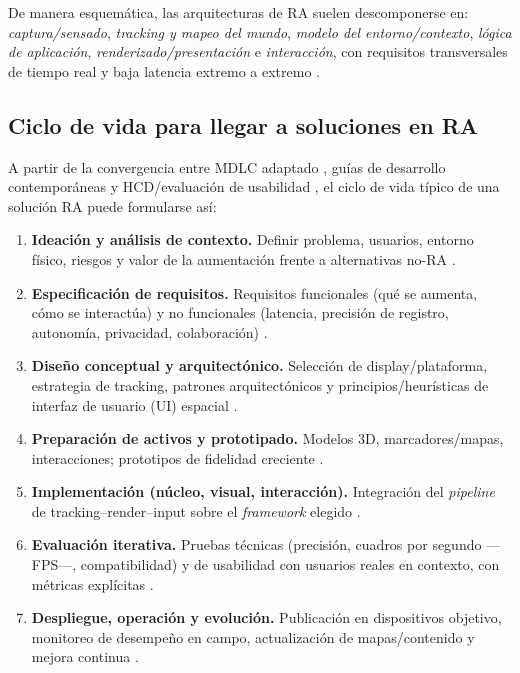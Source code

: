 \documentclass[conference]{IEEEtran}
\begin{document}
De manera esquemática, las arquitecturas de RA suelen descomponerse en: \textit{captura/sensado}, \textit{tracking y mapeo del mundo}, \textit{modelo del entorno/contexto}, \textit{lógica de aplicación}, \textit{renderizado/presentación} e \textit{interacción}, con requisitos transversales de tiempo real y baja latencia extremo a extremo \cite{Reicher2003,ETSI-ARF003}.

\subsection{Ciclo de vida para llegar a soluciones en RA}

A partir de la convergencia entre MDLC adaptado \cite{Roedavan2025}, guías de desarrollo contemporáneas \cite{Devagiri2024} y HCD/evaluación de usabilidad \cite{ISO9241210,NIST2022}, el ciclo de vida típico de una solución RA puede formularse así:

\begin{enumerate}
\item \textbf{Ideación y análisis de contexto.} Definir problema, usuarios, entorno físico, riesgos y valor de la aumentación frente a alternativas no-RA \cite{Devagiri2024,NIST2022}.
\item \textbf{Especificación de requisitos.} Requisitos funcionales (qué se aumenta, cómo se interactúa) y no funcionales (latencia, precisión de registro, autonomía, privacidad, colaboración) \cite{Reicher2003,Sereno2022}.
\item \textbf{Diseño conceptual y arquitectónico.} Selección de display/plataforma, estrategia de tracking, patrones arquitectónicos y principios/heurísticas de interfaz de usuario (UI) espacial \cite{MacWilliams2004,ETSI-ARF003,Endsley2017}.
\item \textbf{Preparación de activos y prototipado.} Modelos 3D, marcadores/mapas, interacciones; prototipos de fidelidad creciente \cite{Roedavan2025,Schmalstieg2016}.
\item \textbf{Implementación (núcleo, visual, interacción).} Integración del \textit{pipeline} de tracking–render–input sobre el \textit{framework} elegido \cite{Roedavan2025,Syed2023}.
\item \textbf{Evaluación iterativa.} Pruebas técnicas (precisión, cuadros por segundo ---FPS---, compatibilidad) y de usabilidad con usuarios reales en contexto, con métricas explícitas \cite{NIST2022,Dunser2011}.
\item \textbf{Despliegue, operación y evolución.} Publicación en dispositivos objetivo, monitoreo de desempeño en campo, actualización de mapas/contenido y mejora continua \cite{Devagiri2024}.
\end{enumerate}
\end{document}
